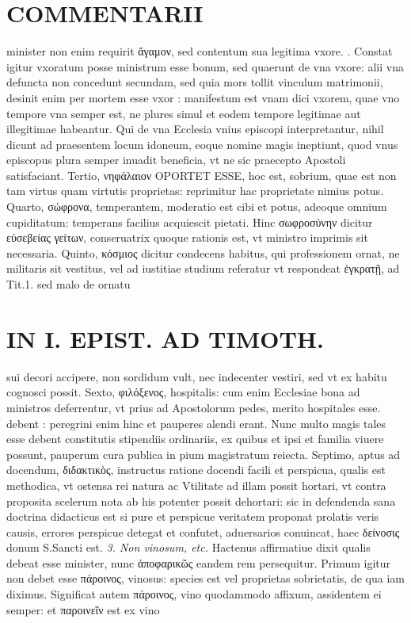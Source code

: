 \documentclass{article}
\begin{document}
\begin{pages}
\section*{COMMENTARII }
\marginpar{[ p.64 ]}\pstart minister non enim requirit ἄγαμον, sed contentum sua legitima vxore. .  \pend\pstart Constat igitur vxoratum posse ministrum esse bonum, sed quaerunt de vna vxore: alii vna defuncta non concedunt secundam, sed quia mors tollit vinculum matrimonii, desinit enim per mortem esse vxor : manifestum est vnam dici vxorem, quae vno tempore vna semper est, ne plures simul et eodem tempore legitimae aut illegitimae habeantur. Qui de vna Ecclesia vnius episcopi interpretantur, nihil dicunt ad praesentem locum idoneum, eoque nomine magis ineptiunt, quod vnus episcopus plura semper inuadit beneficia, vt ne sic praecepto Apostoli satisfaciant.  \pend\pstart Tertio, νηφάλαιον OPORTET ESSE, hoc est, sobrium, quae est non tam virtus quam virtutis proprietas: reprimitur hac proprietate nimius potus.  \pend\pstart Quarto, σώφρονα, temperantem, moderatio est cibi et potus, adeoque omnium cupiditatum: temperans facilius acquiescit pietati. Hinc σωφροσύνην dicitur εὐσεβείας γείτων, conseruatrix quoque rationis est, vt ministro imprimis sit necessaria.  \pend\pstart Quinto, κόσμιος dicitur condecens habitus, qui professionem ornat, ne militaris sit vestitus, vel ad iustitiae studium referatur vt respondeat ἐγκρατῇ, ad Tit.1. sed malo de ornatu  \pend
\section*{IN I. EPIST. AD TIMOTH. }
\marginpar{[ p.65 ]}\pstart sui decori accipere, non sordidum vult, nec indecenter vestiri, sed vt ex habitu cognosci possit.  \pend\pstart Sexto, φιλόξενος, hospitalis: cum enim Ecclesiae bona ad ministros deferrentur, vt prius ad Apostolorum pedes, merito hospitales esse. debent : peregrini enim hinc et pauperes alendi erant. Nunc multo magis tales esse debent constitutis stipendiis ordinariis, ex quibus et ipsi et familia viuere possunt, pauperum cura publica in pium magistratum reiecta. Septimo, aptus ad docendum, διδακτικὸς, instructus ratione docendi facili et perspicua, qualis est methodica, vt ostensa rei natura ac Vtilitate ad illam possit hortari, vt contra proposita scelerum nota ab his potenter possit dehortari: sic in defendenda sana doctrina didacticus est si pure et perspicue veritatem proponat prolatis veris causis, errores perspicue detegat et confutet, aduersarios conuincat, haec δείνοσις donum S.Sancti est.  \pend
\textit{3. Non vinosum, etc. }\pstart Hactenus affirmatiue dixit qualis debeat esse minister, nunc ἀποφαρικῶς eandem rem persequitur. Primum igitur non debet esse πάροινος, vinosus: species est vel proprietas sobrietatis, de qua iam diximus. Significat autem πάροινος, vino quodammodo affixum, assidentem ei semper: et παροινεῖν est ex vino  \pend

\end{pages}
\end{document}
